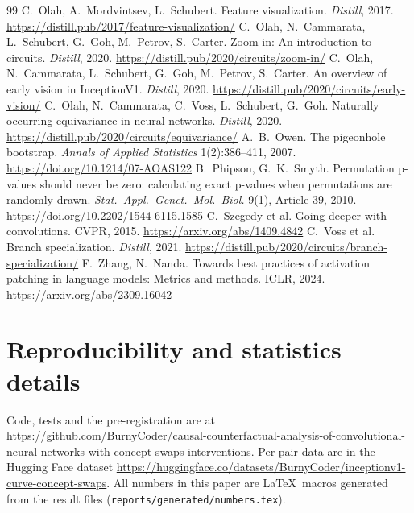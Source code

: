 \documentclass[11pt]{article}
\begin{document}
\begin{thebibliography}{99}
 C.~Olah, A.~Mordvintsev, L.~Schubert. Feature visualization. \emph{Distill}, 2017. \url{https://distill.pub/2017/feature-visualization/}
 C.~Olah, N.~Cammarata, L.~Schubert, G.~Goh, M.~Petrov, S.~Carter. Zoom in: An introduction to circuits. \emph{Distill}, 2020. \url{https://distill.pub/2020/circuits/zoom-in/}
 C.~Olah, N.~Cammarata, L.~Schubert, G.~Goh, M.~Petrov, S.~Carter. An overview of early vision in InceptionV1. \emph{Distill}, 2020. \url{https://distill.pub/2020/circuits/early-vision/}
 C.~Olah, N.~Cammarata, C.~Voss, L.~Schubert, G.~Goh. Naturally occurring equivariance in neural networks. \emph{Distill}, 2020. \url{https://distill.pub/2020/circuits/equivariance/}
 A.~B.~Owen. The pigeonhole bootstrap. \emph{Annals of Applied Statistics} 1(2):386--411, 2007. \url{https://doi.org/10.1214/07-AOAS122}
 B.~Phipson, G.~K.~Smyth. Permutation p-values should never be zero: calculating exact p-values when permutations are randomly drawn. \emph{Stat.\ Appl.\ Genet.\ Mol.\ Biol.} 9(1), Article 39, 2010. \url{https://doi.org/10.2202/1544-6115.1585}
 C.~Szegedy et al. Going deeper with convolutions. CVPR, 2015. \url{https://arxiv.org/abs/1409.4842}
 C.~Voss et al. Branch specialization. \emph{Distill}, 2021. \url{https://distill.pub/2020/circuits/branch-specialization/}
 F.~Zhang, N.~Nanda. Towards best practices of activation patching in language models: Metrics and methods. ICLR, 2024. \url{https://arxiv.org/abs/2309.16042}
\end{thebibliography}

\appendix
\section{Reproducibility and statistics details}
Code, tests and the pre-registration are at \url{https://github.com/BurnyCoder/causal-counterfactual-analysis-of-convolutional-neural-networks-with-concept-swaps-interventions}. Per-pair data are in the Hugging Face dataset \url{https://huggingface.co/datasets/BurnyCoder/inceptionv1-curve-concept-swaps}. All numbers in this paper are \LaTeX\ macros generated from the result files (\texttt{reports/generated/numbers.tex}).
\end{document}
